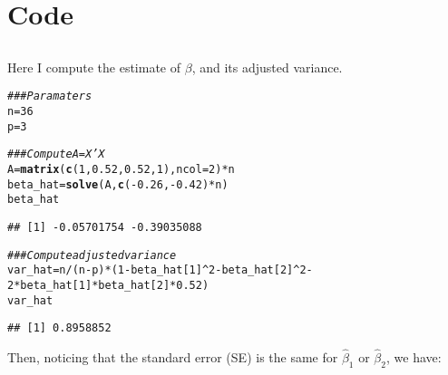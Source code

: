 \documentclass[11pt]{article}\usepackage[]{graphicx}\usepackage[]{color}
\makeatletter
\newcommand{\hlnum}[1]{\textcolor[rgb]{0.686,0.059,0.569}{#1}}%
\newcommand{\hlcom}[1]{\textcolor[rgb]{0.678,0.584,0.686}{\textit{#1}}}%
\newcommand{\hlopt}[1]{\textcolor[rgb]{0,0,0}{#1}}%
\newcommand{\hlstd}[1]{\textcolor[rgb]{0.345,0.345,0.345}{#1}}%
\newcommand{\hlkwb}[1]{\textcolor[rgb]{0.69,0.353,0.396}{#1}}%
\newcommand{\hlkwc}[1]{\textcolor[rgb]{0.333,0.667,0.333}{#1}}%
\newcommand{\hlkwd}[1]{\textcolor[rgb]{0.737,0.353,0.396}{\textbf{#1}}}%
\newenvironment{kframe}{%
 \def\at@end@of@kframe{}%
 \ifinner\ifhmode%
  \def\at@end@of@kframe{\end{minipage}}%
  \begin{minipage}{\columnwidth}%
 \fi\fi%
 \def\FrameCommand##1{\hskip\@totalleftmargin \hskip-\fboxsep
 \colorbox{shadecolor}{##1}\hskip-\fboxsep
     \hskip-\linewidth \hskip-\@totalleftmargin \hskip\columnwidth}%
 \MakeFramed {\advance\hsize-\width
   \@totalleftmargin\z@ \linewidth\hsize
   \@setminipage}}%
 {\par\unskip\endMakeFramed%
 \at@end@of@kframe}
\newenvironment{knitrout}{}{} %
\makeatother
\begin{document}
\section{Code}

\subsection{}
Here I compute the estimate of $\beta$, and its adjusted variance.
\begin{knitrout}
\color{fgcolor}\begin{kframe}
\begin{alltt}
\hlcom{## # Paramaters}
\hlstd{n} \hlkwb{=} \hlnum{36}
\hlstd{p} \hlkwb{=} \hlnum{3}

\hlcom{## # Compute A = X'X}
\hlstd{A} \hlkwb{=} \hlkwd{matrix}\hlstd{(}\hlkwd{c}\hlstd{(}\hlnum{1}\hlstd{,}\hlnum{0.52}\hlstd{,}\hlnum{0.52}\hlstd{,}\hlnum{1}\hlstd{),}\hlkwc{ncol}\hlstd{=}\hlnum{2}\hlstd{)}\hlopt{*}\hlstd{n}
\hlstd{beta_hat} \hlkwb{=} \hlkwd{solve}\hlstd{(A,}\hlkwd{c}\hlstd{(}\hlopt{-}\hlnum{0.26}\hlstd{,}\hlopt{-}\hlnum{0.42}\hlstd{)}\hlopt{*}\hlstd{n)}
\hlstd{beta_hat}
\end{alltt}
\begin{verbatim}
## [1] -0.05701754 -0.39035088
\end{verbatim}
\begin{alltt}
\hlcom{## # Compute adjusted variance}
\hlstd{var_hat} \hlkwb{=} \hlstd{n}\hlopt{/}\hlstd{(n}\hlopt{-}\hlstd{p)}\hlopt{*}\hlstd{(}\hlnum{1}\hlopt{-}\hlstd{beta_hat[}\hlnum{1}\hlstd{]}\hlopt{^}\hlnum{2}\hlopt{-}\hlstd{beta_hat[}\hlnum{2}\hlstd{]}\hlopt{^}\hlnum{2}\hlopt{-}
                     \hlnum{2}\hlopt{*}\hlstd{beta_hat[}\hlnum{1}\hlstd{]}\hlopt{*}\hlstd{beta_hat[}\hlnum{2}\hlstd{]}\hlopt{*}\hlnum{0.52}\hlstd{)}
\hlstd{var_hat}
\end{alltt}
\begin{verbatim}
## [1] 0.8958852
\end{verbatim}
\end{kframe}
\end{knitrout}
Then, noticing that the standard error (SE) is the same for $\hat{\beta}_1$ or $\hat{\beta}_2$, we have:
\end{document}

